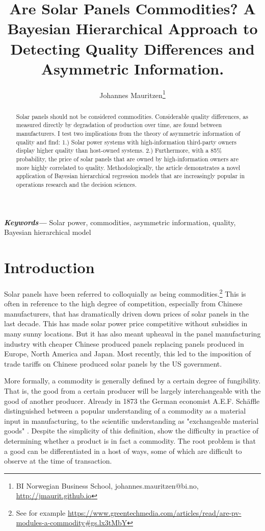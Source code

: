 \documentclass[a4paper]{article}
\title{Are Solar Panels Commodities? A Bayesian Hierarchical Approach to Detecting Quality Differences and Asymmetric Information.}
\author{Johannes Mauritzen\thanks{BI Norwegian Business School, johannes.mauritzen@bi.no, \url{http://jmaurit.github.io}}}
\providecommand{\keywords}[1]
{
  \small
  \textbf{\textit{Keywords---}} #1
}
\begin{document}
\maketitle

\begin{abstract}
Solar panels should not be considered commodities. Considerable quality differences, as measured directly by degradation of production over time, are found between manufacturers. I test two implications from the theory of asymmetric information of quality and find: 1.) Solar power systems with high-information third-party owners display higher quality than host-owned systems. 2.) Furthermore, with a 85\% probability, the price of solar panels that are owned by high-information owners are more highly correlated to quality. Methodologically, the article demonstrates a novel application of Bayesian hierarchical regression models that are increasingly popular in operations research and the decision sciences.
\end{abstract}

\keywords{Solar power, commodities, asymmetric information, quality, Bayesian hierarchical model}

\newpage{}

\section{Introduction}

Solar panels have been referred to colloquially as being commodities.\footnote{See for example \url{https://www.greentechmedia.com/articles/read/are-pv-modules-a-commodity\#gs.lx3tMbY}} This is often in reference to the high degree of competition, especially from Chinese manufacturers, that has dramatically driven down prices of solar panels in the last decade. This has made solar power price competitive without subsidies in many sunny locations. But it has also meant upheaval in the panel manufacturing industry with cheaper Chinese produced panels replacing panels produced in Europe, North America and Japan. Most recently, this led to the imposition of trade tariffs on Chinese produced solar panels by the US government.

More formally, a commodity is generally defined by a certain degree of fungibility. That is, the good from a certain producer will be largely interchangeable with the good of another producer. Already in 1873 the German economist A.E.F. Schäffle distinguished between a popular understanding of a commodity as a material input in manufacturing, to the scientific understanding as "exchangeable material goods" \citep{menger_principles_2007}. Despite the simplicity of this definition, \citet{gordon_what_1999} show the difficulty in practice of determining whether a product is in fact a commodity. The root problem is that a good can be differentiated in a host of ways, some of which are difficult to observe at the time of transaction.
\end{document}
